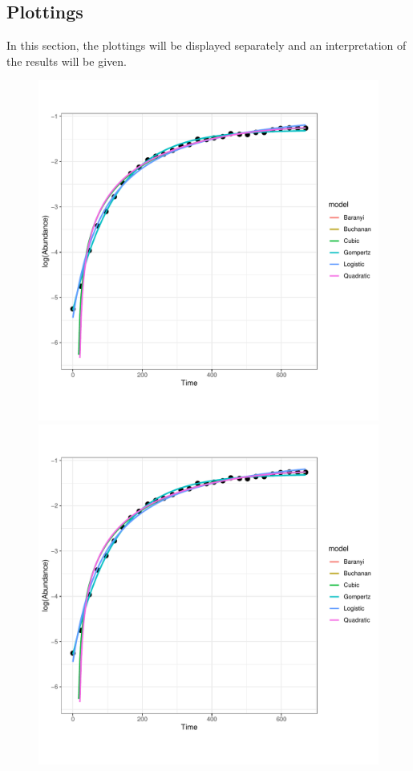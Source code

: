 \documentclass[11pt, oneside]{article}
\begin{document}
		\subsection{Plottings}
		
		In this section, the plottings will be displayed separately and an interpretation of the results will be given.
		
		\begin{figure}[H]
			\begin{center}
			\begin{minipage}{.5\textwidth}
				\centering
				\includegraphics[page=4, scale = 0.5]{plot_subsets.pdf}
			\end{minipage}%
			\begin{minipage}{.5\textwidth}
				\centering
				\includegraphics[page=66, scale = 0.5]{plot_subsets.pdf}

\end{minipage}
\end{center}
\end{figure}
\end{document}
